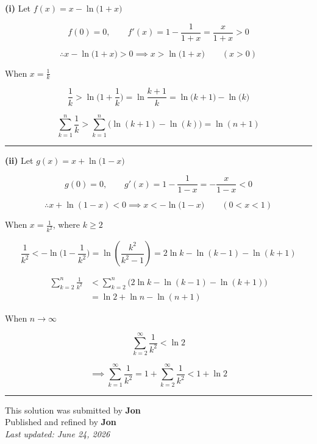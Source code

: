 \documentclass[12pt]{article}
\begin{document}
\newcommand{\ds}{\displaystyle}

\textbf{(i)} Let $\ds f(x)=x-\ln\bigl(1+x\bigr)$

$$f(0)=0,\qquad f'(x)=1-\frac1{1+x}=\frac{x}{1+x}>0$$

$$\therefore x-\ln\bigl(1+x\bigr)>0 \implies x>\ln\bigl(1+x\bigr)\qquad(x>0)$$

When $\ds x=\frac1k$

$$\frac1k>\ln\bigl(1+\frac1k\bigr)=\ln\frac{k+1}{k}=\ln\bigl(k+1\bigr)-\ln\bigl(k\bigr)$$

$$\sum_{k=1}^{n}\frac1k>\sum_{k=1}^{n}\bigl(\ln(k+1)-\ln(k)\Bigr)=\ln(n+1)$$

\bigskip\hrule\bigskip

\textbf{(ii)} Let $\ds g(x)=x+\ln\bigl(1-x\bigr)$

$$g(0)=0,\qquad g'(x)=1-\frac1{1-x}=-\frac{x}{1-x}<0$$

$$\therefore x+\ln(1-x)<0\implies x< -\ln\bigl(1-x\bigr)\qquad(0<x<1)$$

When $\ds x=\frac1{k^2}$, where $k\geq2$

$$\frac1{k^2}<-\ln\bigl(1-\frac1{k^2}\bigr)=\ln(\frac{k^2}{k^2-1})=2\ln k-\ln(k-1)-\ln(k+1)$$

\begin{align*}
\sum_{k=2}^{n}\frac1{k^2}
&<\sum_{k=2}^{n}\bigl(2\ln k-\ln(k-1)-\ln(k+1)\bigr)\\
&=\ln2+\ln n-\ln(n+1)
\end{align*}

When $n\to\infty$

$$\sum_{k=2}^{\infty}\frac1{k^2}<\ln2$$

$$\implies \sum_{k=1}^{\infty}\frac1{k^2}=1+\sum_{k=2}^{\infty}\frac1{k^2}<1+\ln2$$



\bigskip
\hrule
\begin{center}
    This solution was submitted by \textbf{Jon}\\[4pt]
    Published and refined by \textbf{Jon}\\[8pt]
    \textit{Last updated: June 24, 2026}
\end{center}
\end{document}

